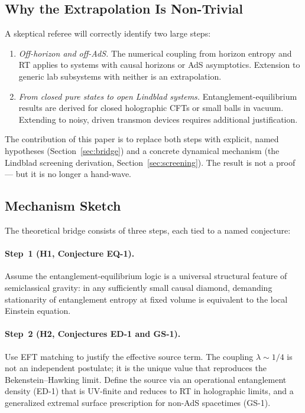 \documentclass[12pt,letterpaper]{article}
\theoremstyle{definition}
\theoremstyle{remark}
\begin{document}
\subsection{Why the Extrapolation Is Non-Trivial}

A skeptical referee will correctly identify two large steps:

\begin{enumerate}
\item \textit{Off-horizon and off-AdS.} The numerical coupling from horizon entropy and
      RT applies to systems with causal horizons or AdS asymptotics.
      Extension to generic lab subsystems with neither is an extrapolation.

\item \textit{From closed pure states to open Lindblad systems.}
      Entanglement-equilibrium results are derived for closed holographic CFTs or small
      balls in vacuum.  Extending to noisy, driven transmon devices requires additional
      justification.
\end{enumerate}

The contribution of this paper is to replace both steps with explicit, named hypotheses
(Section~\ref{sec:bridge}) and a concrete dynamical mechanism (the Lindblad screening
derivation, Section~\ref{sec:screening}).  The result is not a proof --- but it is no
longer a hand-wave.

\subsection{Mechanism Sketch}
\label{sec:mechsketch}

The theoretical bridge consists of three steps, each tied to a named conjecture:

\paragraph{Step~1 (H1, Conjecture EQ-1).}
Assume the entanglement-equilibrium logic \cite{jacobson2016,faulkner2014,bueno2017}
is a universal structural feature of semiclassical gravity: in any sufficiently small
causal diamond, demanding stationarity of entanglement entropy at fixed volume is
equivalent to the local Einstein equation.

\paragraph{Step~2 (H2, Conjectures ED-1 and GS-1).}
Use EFT matching to justify the effective source term.
The coupling $\lambda \sim 1/4$ is not an independent postulate; it is the unique value
that reproduces the Bekenstein--Hawking limit.
Define the source via an operational entanglement density (ED-1) that is UV-finite and
reduces to RT in holographic limits, and a generalized extremal surface prescription
for non-AdS spacetimes (GS-1).
\end{document}
